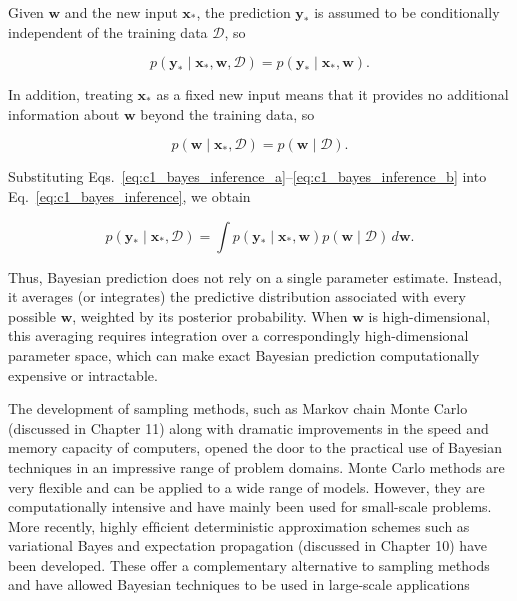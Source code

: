 \documentclass[10pt,twocolumn]{memoir}
\begin{document}
Given $\mathbf{w}$ and the new input $\mathbf{x}_*$, the prediction $\mathbf{y}_*$ is assumed to be conditionally independent of the training data $\mathcal{D}$, so

\begin{equation}
    p(\mathbf{y}_*\mid\mathbf{x}_*,\mathbf{w},\mathcal{D}) = p(\mathbf{y}_*\mid\mathbf{x}_*,\mathbf{w}).
\label{eq:c1_bayes_inference_a}
\end{equation}

In addition, treating $\mathbf{x}_*$ as a fixed new input means that it provides no additional information about $\mathbf{w}$ beyond the training data, so

\begin{equation}
    p(\mathbf{w}\mid\mathbf{x}_*,\mathcal{D}) = p(\mathbf{w}\mid\mathcal{D}).
\label{eq:c1_bayes_inference_b}
\end{equation}

Substituting Eqs.~\ref{eq:c1_bayes_inference_a}--\ref{eq:c1_bayes_inference_b} into Eq.~\ref{eq:c1_bayes_inference}, we obtain

\begin{equation}
    p(\mathbf{y}_*\mid\mathbf{x}_*,\mathcal{D}) = \int p(\mathbf{y}_*\mid\mathbf{x}_*,\mathbf{w}) p(\mathbf{w}\mid\mathcal{D})\,d\mathbf{w}.
\end{equation}

Thus, Bayesian prediction does not rely on a single parameter estimate. Instead, it averages (or integrates) the predictive distribution associated with every possible $\mathbf{w}$, weighted by its posterior probability. When $\mathbf{w}$ is high-dimensional, this averaging requires integration over a correspondingly high-dimensional parameter space, which can make exact Bayesian prediction computationally expensive or intractable.

The development of sampling methods, such as Markov chain Monte Carlo (discussed in Chapter 11) along with dramatic improvements in the speed and memory capacity of computers, opened the door to the practical use of Bayesian techniques in an impressive range of problem domains. Monte Carlo methods are very ﬂexible and can be applied to a wide range of models. However, they are computationally intensive and have mainly been used for small-scale problems. More recently, highly efﬁcient deterministic approximation schemes such as variational Bayes and expectation propagation (discussed in Chapter 10) have been developed. These offer a complementary alternative to sampling methods and have allowed Bayesian techniques to be used in large-scale applications
\end{document}
